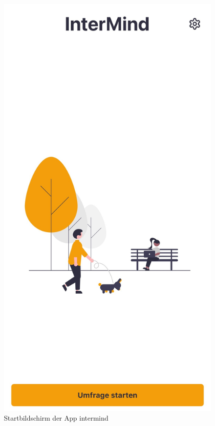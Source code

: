 \begin{figure}[h]
    \centering
    \begin{minipage}[t]{0.38\textwidth}
        \centering
        \includegraphics[width=\textwidth]{Arbeit/images/printscreens/startscreen.jpeg}
        \caption{Startbildschirm der App \gls{intermind}}

\end{minipage}
\end{figure}
